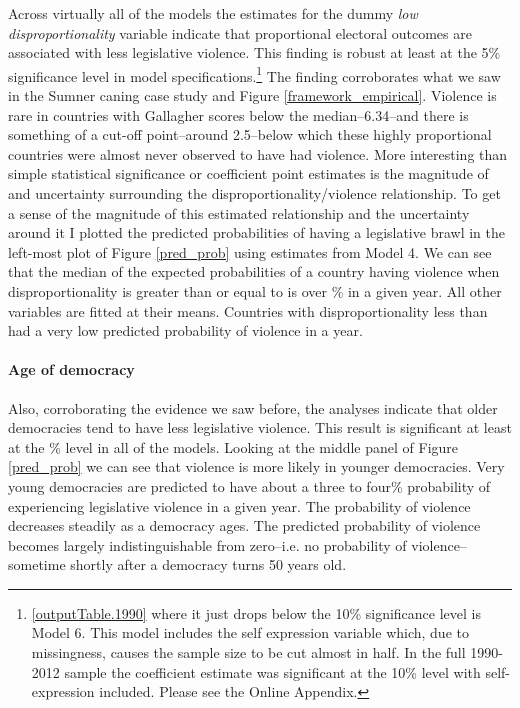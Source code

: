 \documentclass[a4paper]{article}\usepackage[]{graphicx}\usepackage[]{color}
\begin{document}
Across virtually all of the models the estimates for the dummy {\emph{low disproportionality}} variable indicate that proportional electoral outcomes are associated with less legislative violence. This finding is robust at least at the 5\% significance level in  model specifications.\footnote{ \ref{outputTable.1990} {where it just drops below the 10\% significance level is Model 6. This model includes the self expression variable which, due to missingness, causes the sample size to be cut almost in half. In the full 1990-2012 sample the coefficient estimate was significant at the 10\% level with self-expression included. Please see the Online Appendix.}} The finding corroborates what we saw in the Sumner caning case study and Figure \ref{framework_empirical}. Violence is rare in countries with Gallagher scores below the median--6.34--and there is something of a cut-off point--around 2.5--below which these highly proportional countries were almost never observed to have had violence. More interesting than simple statistical significance or coefficient point estimates is the magnitude of and uncertainty surrounding the disproportionality/violence relationship. To get a sense of the magnitude of this estimated relationship and the uncertainty around it I plotted the predicted probabilities of having a legislative brawl in the left-most plot of Figure \ref{pred_prob} using estimates from Model 4. We can see that the median of the expected probabilities of a country having violence when disproportionality is greater than or equal to  is  over \% in a given year. All other variables are fitted at their means. Countries with disproportionality less than  had a very low predicted probability of violence in a year.

\paragraph{Age of democracy}

Also, corroborating the evidence we saw before, the analyses indicate that older democracies tend to have less legislative violence. This result is significant at least at the \% level in all of the models. Looking at the middle panel of Figure \ref{pred_prob} we can see that violence is more likely in younger democracies. Very young democracies are predicted to have about a three to four\% probability of experiencing legislative violence in a given year. The probability of violence decreases steadily as a democracy ages. The predicted probability of violence becomes largely indistinguishable from zero--i.e. no probability of violence--sometime shortly after a democracy turns 50 years old.
\end{document}
